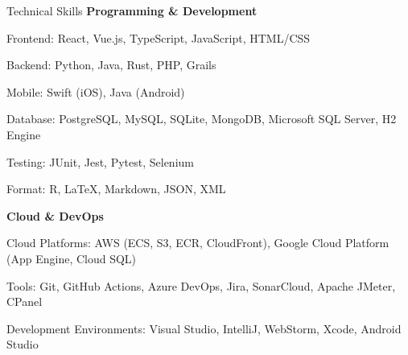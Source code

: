 \begin{resume_section}{Technical Skills}
    \textbf{Programming \& Development}
    \begin{subitems}
        \item Frontend: React, Vue.js, TypeScript, JavaScript, HTML/CSS
        \item Backend: Python, Java, Rust, PHP, Grails
        \item Mobile: Swift (iOS), Java (Android)
        \item Database: PostgreSQL, MySQL, SQLite, MongoDB, Microsoft SQL Server, H2 Engine
        \item Testing: JUnit, Jest, Pytest, Selenium
        \item Format: R, LaTeX, Markdown, JSON, XML
    \end{subitems}
    \textbf{Cloud \& DevOps}
    \begin{subitems}
        \item Cloud Platforms: AWS (ECS, S3, ECR, CloudFront), Google Cloud Platform (App Engine, Cloud SQL)
        \item Tools: Git, GitHub Actions, Azure DevOps, Jira, SonarCloud, Apache JMeter, CPanel
        \item Development Environments: Visual Studio, IntelliJ, WebStorm, Xcode, Android Studio
    \end{subitems}
\end{resume_section}

